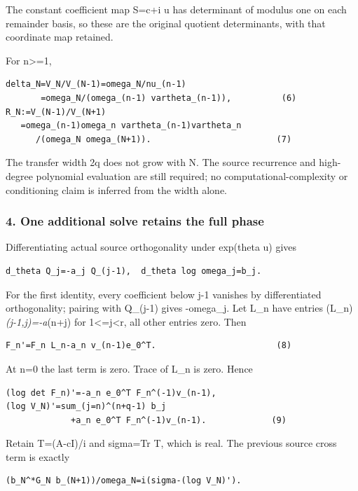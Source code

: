 The constant coefficient map S=c+i u has determinant of modulus one on each remainder basis, so these are the original quotient determinants, with that coordinate map retained.

For n\textgreater=1,

\begin{verbatim}
delta_N=V_N/V_(N-1)=omega_N/nu_(n-1)
       =omega_N/(omega_(n-1) vartheta_(n-1)),          (6)
R_N:=V_(N-1)/V_(N+1)
   =omega_(n-1)omega_n vartheta_(n-1)vartheta_n
      /(omega_N omega_(N+1)).                         (7)
\end{verbatim}

The transfer width 2q does not grow with N. The source recurrence and high-degree polynomial evaluation are still required; no computational-complexity or conditioning claim is inferred from the width alone.

\subsubsection{4. One additional solve retains the full phase}\label{endpoint-pr24_current_corrected--one-additional-solve-retains-the-full-phase}

Differentiating actual source orthogonality under exp(theta u) gives

\begin{verbatim}
d_theta Q_j=-a_j Q_(j-1),  d_theta log omega_j=b_j.
\end{verbatim}

For the first identity, every coefficient below j-1 vanishes by differentiated orthogonality; pairing with Q\_(j-1) gives -omega\_j. Let L\_n have entries (L\_n)\emph{(j-1,j)=-a}(n+j) for 1\textless=j\textless r, all other entries zero. Then

\begin{verbatim}
F_n'=F_n L_n-a_n v_(n-1)e_0^T.                        (8)
\end{verbatim}

At n=0 the last term is zero. Trace of L\_n is zero. Hence

\begin{verbatim}
(log det F_n)'=-a_n e_0^T F_n^(-1)v_(n-1),
(log V_N)'=sum_(j=n)^(n+q-1) b_j
             +a_n e_0^T F_n^(-1)v_(n-1).             (9)
\end{verbatim}

Retain T=(A-cI)/i and sigma=Tr T, which is real. The previous source cross term is exactly

\begin{verbatim}
(b_N^*G_N b_(N+1))/omega_N=i(sigma-(log V_N)').
\end{verbatim}

